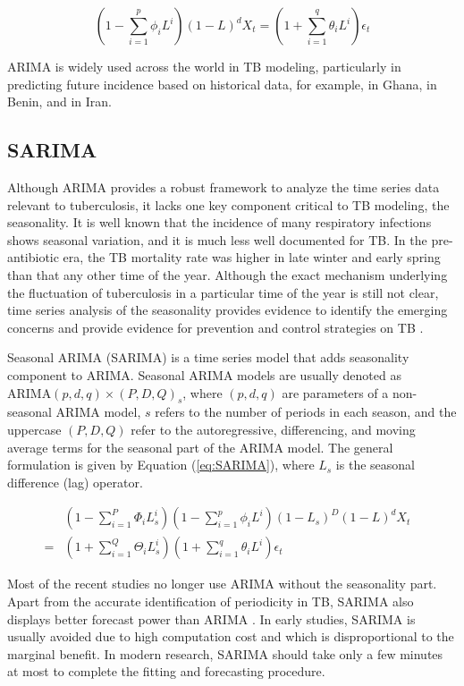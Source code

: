 \documentclass[8pt,twocolumn]{extarticle}
\newcommand{\arima}{\text{ARIMA}}
\begin{document}
\begin{equation}\label{eq:ARIMA}
    (1-\sum_{i=1}^{p}\phi_{i}L^{i})(1-L)^{d}X_{t}=(1+\sum_{i=1}^{q}\theta_{i}L^{i})\epsilon_{t}
\end{equation}

ARIMA is widely used across the world in TB modeling, particularly in predicting future incidence based on historical data, for example, \cite{ForecastGhana} in Ghana, \cite{ForecastBenin} in Benin, and \cite{ForecastIran} in Iran.

\subsection{SARIMA}
Although ARIMA provides a robust framework to analyze the time series data relevant to tuberculosis, it lacks one key component critical to TB modeling, the seasonality. It is well known that the incidence of many respiratory infections shows seasonal variation, and it is much less well documented for TB. In the pre-antibiotic era, the TB mortality rate was higher in late winter and early spring than that any other time of the year. Although the exact mechanism underlying the fluctuation of tuberculosis in a particular time of the year is still not clear, time series analysis of the seasonality provides evidence to identify the emerging concerns and provide evidence for prevention and control strategies on TB \cite{SeasonTBChina}. 

Seasonal ARIMA (SARIMA) is a time series model that adds seasonality component to ARIMA. Seasonal ARIMA models are usually denoted as $\arima(p,d,q)\times(P,D,Q)_s$, where $(p,d,q)$ are parameters of a non-seasonal ARIMA model, $s$ refers to the number of periods in each season, and the uppercase $(P,D,Q)$ refer to the autoregressive, differencing, and moving average terms for the seasonal part of the ARIMA model. The general formulation is given by Equation (\ref{eq:SARIMA}), where $L_s$ is the seasonal difference (lag) operator.

\begin{align}
    & (1-\sum_{i=1}^{P}\Phi_{i}L_s^{i})(1-\sum_{i=1}^{p}\phi_{i}L^{i})(1-L_s)^{D}(1-L)^{d}X_{t}  \nonumber \\
  = &(1+\sum_{i=1}^{Q}\Theta_{i}L_s^{i})(1+\sum_{i=1}^{q}\theta_{i}L^{i})\epsilon_{t} & \label{eq:SARIMA}
\end{align}

Most of the recent studies no longer use ARIMA without the seasonality part. Apart from the accurate identification of periodicity in TB, SARIMA also displays better forecast power than ARIMA \cite{ForecastChina2018}. In early studies, SARIMA is usually avoided due to high computation cost and which is disproportional to the marginal benefit. In modern research, SARIMA should take only a few minutes at most to complete the fitting and forecasting procedure.
\end{document}

